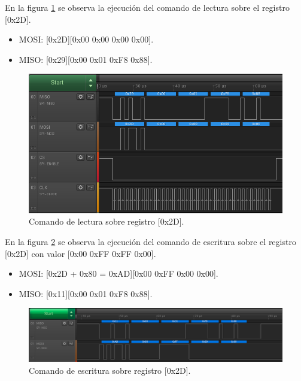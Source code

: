En la figura \ref{fig:ensayo_spi_a} se observa la ejecución del comando de lectura sobre el registro [0x2D]. 
\begin{itemize}
\item MOSI: [0x2D][0x00 0x00 0x00 0x00].
\item MISO: [0x29][0x00 0x01 0xF8 0x88].
\end{itemize}



\begin{figure}[h]
\centering 
\includegraphics[width=1\textwidth]{./Figures/ensayo_spi_a.png}
\caption{Comando de lectura sobre registro [0x2D].}
\label{fig:ensayo_spi_a}
\end{figure}


En la figura \ref{fig:ensayo_spi_b} se observa la ejecución del comando de escritura sobre el registro [0x2D] con valor [0x00 0xFF 0xFF 0x00]. 

\begin{itemize}
\item MOSI: [0x2D + 0x80 = 0xAD][0x00 0xFF 0x00 0x00].
\item MISO: [0x11][0x00 0x01 0xF8 0x88].
\end{itemize}



\begin{figure}[h]
\centering 
\includegraphics[width=1\textwidth]{./Figures/ensayo_spi_b.png}
\caption{Comando de escritura sobre registro [0x2D].}
\label{fig:ensayo_spi_b}
\end{figure}

